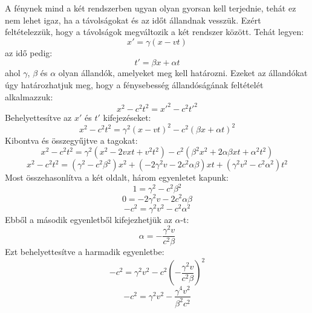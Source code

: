 \documentclass[../main.tex]{subfiles}
\begin{document}
A fénynek mind a két rendszerben ugyan olyan gyorsan kell terjednie, tehát ez nem lehet igaz, ha a távolságokat és az időt állandnak vesszük. Ezért feltételezzük, hogy a távolságok megváltozik a két rendszer között.
Tehát legyen:
\begin{equation}
    x' = \gamma (x - vt)
\end{equation}
az idő pedig:
\begin{equation}
    t' = \beta x + \alpha t
\end{equation}
ahol $\gamma$, $\beta$ és $\alpha$ olyan állandók, amelyeket meg kell határozni. Ezeket az állandókat úgy határozhatjuk meg, hogy a fénysebesség állandóságának feltételét alkalmazzuk:
\begin{equation}
    x^2 - c^2 t^2 = x'^2 - c^2 t'^2
\end{equation}
Behelyettesítve az $x'$ és $t'$ kifejezéseket:
\begin{equation}
    x^2 - c^2 t^2 = \gamma^2 (x - vt)^2 - c^2 (\beta x + \alpha t)^2
\end{equation}
Kibontva és összegyűjtve a tagokat:
\begin{equation}
    x^2 - c^2 t^2 = \gamma^2 (x^2 - 2vxt + v^2 t^2) - c^2 (\beta^2 x^2 + 2 \alpha \beta xt + \alpha^2 t^2)
\end{equation}
\begin{equation}
    x^2 - c^2 t^2 = (\gamma^2 - c^2 \beta^2) x^2 + (-2 \gamma^2 v - 2 c^2 \alpha \beta) xt + (\gamma^2 v^2 - c^2 \alpha^2) t^2
\end{equation}
Most összehasonlítva a két oldalt, három egyenletet kapunk:
\begin{equation}
    1 = \gamma^2 - c^2 \beta^2
\end{equation}
\begin{equation}
    0 = -2 \gamma^2 v - 2 c^2 \alpha \beta
\end{equation}
\begin{equation}
    -c^2 = \gamma^2 v^2 - c^2 \alpha^2
\end{equation}
Ebből a második egyenletből kifejezhetjük az $\alpha$-t:
\begin{equation}
    \alpha = -\frac{\gamma^2 v}{c^2 \beta}
\end{equation}
Ezt behelyettesítve a harmadik egyenletbe:
\begin{equation}
    -c^2 = \gamma^2 v^2 - c^2 \left(-\frac{\gamma^2 v}{c^2 \beta}\right)^2
\end{equation}
\begin{equation}
    -c^2 = \gamma^2 v^2 - \frac{\gamma^4 v^2}{\beta^2 c^2}
\end{equation}
\end{document}
